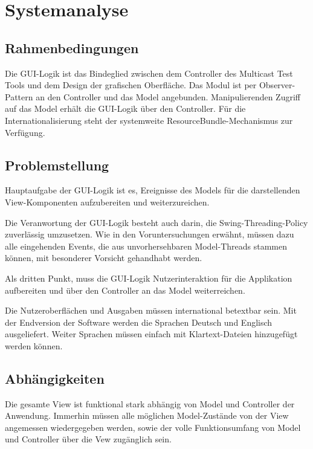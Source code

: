\section{Systemanalyse}

    \subsection{Rahmenbedingungen}
    
        Die GUI-Logik ist das Bindeglied zwischen dem Controller des Multicast
        Test Tools und dem Design der grafischen Oberfläche. Das Modul ist per
        Observer-Pattern an den Controller und das Model angebunden.
        Manipulierenden Zugriff auf das Model erhält die GUI-Logik über den
        Controller. Für die Internationalisierung steht der systemweite
        ResourceBundle-Mechanismus zur Verfügung.
    
    \subsection{Problemstellung}
    
        Hauptaufgabe der GUI-Logik ist es, Ereignisse des Models für die
        darstellenden View-Komponenten aufzubereiten und weiterzureichen.
        
        Die Veranwortung der GUI-Logik besteht auch darin, die
        Swing-Threading-Policy zuverlässig umzusetzen. Wie in den Voruntersuchungen
        erwähnt, müssen dazu alle eingehenden Events, die aus unvorhersehbaren
        Model-Threads stammen können, mit besonderer Vorsicht gehandhabt werden.
        
        Als dritten Punkt, muss die GUI-Logik Nutzerinteraktion für die
        Applikation aufbereiten und über den Controller an das Model
        weiterreichen.
        
        Die Nutzeroberflächen und Ausgaben müssen international betextbar sein. Mit der
        Endversion der Software werden die Sprachen Deutsch und Englisch ausgeliefert. Weiter
        Sprachen müssen einfach mit Klartext-Dateien hinzugefügt werden können.
    
    \subsection{Abhängigkeiten}

        Die gesamte View ist funktional stark abhängig von Model und Controller
        der Anwendung. Immerhin müssen alle möglichen Model-Zustände von der
        View angemessen wiedergegeben werden, sowie der volle Funktionsumfang
        von Model und Controller über die Vew zugänglich sein.
        
